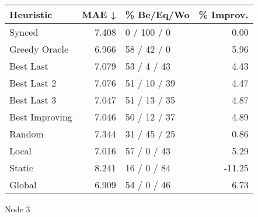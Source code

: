 \begin{tabular}{lrlr}
\toprule
\textbf{Heuristic} & \textbf{MAE ↓} & \textbf{\% Be/Eq/Wo} & \textbf{\% Improv.} \\
\midrule
            Synced &          7.408 &          0 / 100 / 0 &                0.00 \\
     Greedy Oracle &          6.966 &          58 / 42 / 0 &                5.96 \\
         Best Last &          7.079 &          53 / 4 / 43 &                4.43 \\
       Best Last 2 &          7.076 &         51 / 10 / 39 &                4.47 \\
       Best Last 3 &          7.047 &         51 / 13 / 35 &                4.87 \\
    Best Improving &          7.046 &         50 / 12 / 37 &                4.89 \\
            Random &          7.344 &         31 / 45 / 25 &                0.86 \\
             Local &          7.016 &          57 / 0 / 43 &                5.29 \\
            Static &          8.241 &          16 / 0 / 84 &              -11.25 \\
            Global &          6.909 &          54 / 0 / 46 &                6.73 \\
\bottomrule
\end{tabular}
\caption{Node 3}
\label{tab:ds_non_lr05_le2_bs2_3}
